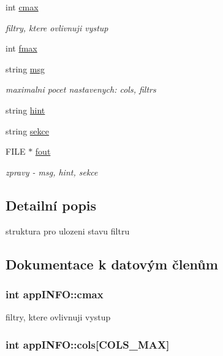 \begin{DoxyCompactItemize}
int \hyperlink{structappINFO_a01029658c954b104b7b981442c9a1655}{cmax}
\begin{DoxyCompactList}\small\item\em filtry, ktere ovlivnuji vystup \end{DoxyCompactList}\item 
int \hyperlink{structappINFO_a97c8f57e46a015eb2f9a2ddf73348f25}{fmax}
\item 
string \hyperlink{structappINFO_ad3bf01db2ebdae4bbc4b14963751c2a8}{msg}
\begin{DoxyCompactList}\small\item\em maximalni pocet nastavenych\-: cols, filtrs \end{DoxyCompactList}\item 
string \hyperlink{structappINFO_a5c23293cc828613f5ce00b3ac415b23e}{hint}
\item 
string \hyperlink{structappINFO_a3deb9643e9aa5638f10183f79eda5876}{sekce}
\item 
\-F\-I\-L\-E $\ast$ \hyperlink{structappINFO_abb0511ea3f7fa90338f6cf28a78eb8fd}{fout}
\begin{DoxyCompactList}\small\item\em zpravy -\/ msg, hint, sekce \end{DoxyCompactList}\end{DoxyCompactItemize}


\subsection{\-Detailní popis}
struktura pro ulozeni stavu filtru 

\subsection{\-Dokumentace k datovým členům}
\hypertarget{structappINFO_a01029658c954b104b7b981442c9a1655}{
\subsubsection[{cmax}]{\setlength{\rightskip}{0pt plus 5cm}int {\bf app\-I\-N\-F\-O\-::cmax}}}
\label{d3/d7d/structappINFO_a01029658c954b104b7b981442c9a1655}


filtry, ktere ovlivnuji vystup 

\hypertarget{structappINFO_ad97cbcd08e92d265bceb5fd0a2e0e184}{
\subsubsection[{cols}]{\setlength{\rightskip}{0pt plus 5cm}int {\bf app\-I\-N\-F\-O\-::cols}\mbox{[}\-C\-O\-L\-S\-\_\-\-M\-A\-X\mbox{]}}}
\label{d3/d7d/structappINFO_ad97cbcd08e92d265bceb5fd0a2e0e184}


